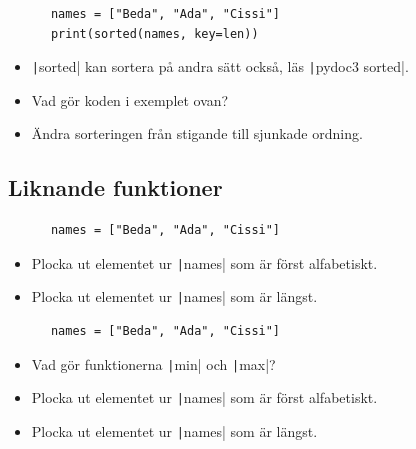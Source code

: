 \begin{frame}[fragile]
  \begin{example}[Sortering]
    \begin{verbatim}
      names = ["Beda", "Ada", "Cissi"]
      print(sorted(names, key=len))
    \end{verbatim}
  \end{example}

  \begin{exercise}
    \begin{itemize}
      \item \texttt|sorted| kan sortera på andra sätt också, läs 
        \texttt|pydoc3 sorted|.
      \item Vad gör koden i exemplet ovan?
      \item Ändra sorteringen från stigande till sjunkade ordning.
    \end{itemize}
  \end{exercise}
\end{frame}

\subsection{Liknande funktioner}

\begin{frame}[fragile]
  \begin{example}
    \begin{verbatim}
      names = ["Beda", "Ada", "Cissi"]
    \end{verbatim}
  \end{example}

  \begin{exercise}
    \begin{itemize}
      \item Plocka ut elementet ur \texttt|names| som är först 
        alfabetiskt.
      \item Plocka ut elementet ur \texttt|names| som är 
        längst.
    \end{itemize}
  \end{exercise}
\end{frame}

\begin{frame}[fragile]
  \begin{example}
    \begin{verbatim}
      names = ["Beda", "Ada", "Cissi"]
    \end{verbatim}
  \end{example}

  \begin{exercise}
    \begin{itemize}
      \item Vad gör funktionerna \texttt|min| och 
        \texttt|max|?
      \item Plocka ut elementet ur \texttt|names| som är först 
        alfabetiskt.
      \item Plocka ut elementet ur \texttt|names| som är 
        längst.
    \end{itemize}
  \end{exercise}
\end{frame}
